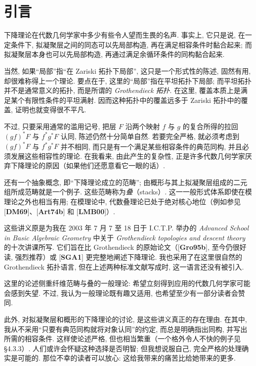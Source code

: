 \chapter*{引言}
下降理论在代数几何学家中多少有些令人望而生畏的名声. 事实上, 它只是说, 在一定条件下, 拟凝聚层之间的同态可以先局部构造, 再在满足相容条件时黏合起来; 而拟凝聚层本身也可以先局部构造, 再通过满足余循环条件的同构黏合起来.

当然, 如果“局部”指“在 Zariski 拓扑下局部”, 这只是一个形式性的陈述, 固然有用, 却很难称得上一个理论. 要点在于, 这里的“局部”指在平坦拓扑下局部; 而平坦拓扑并不是通常意义的拓扑, 而是所谓的 \emph{Grothendieck 拓扑}. 在这里, 覆盖本质上是满足某个有限性条件的平坦满射. 因而这种拓扑中的覆盖远多于 Zariski 拓扑中的覆盖, 证明也就变得很不平凡.

不过, 只要采用通常的滥用记号, 把层 $F$ 沿两个映射 $f$ 与 $g$ 的复合所得的拉回 $(gf)^*F$ 与 $f^*g^*F$ 认同, 陈述仍然十分简单自然. 若要完全严格, 就必须考虑到 $(gf)^*F$ 与 $f^*g^*F$ 并不相同, 而只是有一个满足某些相容条件的典范同构, 并且必须发展这些相容性的理论. 在我看来, 由此产生的复杂性, 正是许多代数几何学家厌弃下降理论的原因（如果他们还愿意看它一眼的话）.

还有一个抽象概念, 即“下降理论成立的范畴”; 由概形与其上拟凝聚层组成的二元组所成范畴就是一个例子. 这些范畴称为\emph{叠}（stacks）. 这一一般形式体系即使在模理论之外也相当有用; 在模理论中, 代数叠理论已处于绝对核心地位（例如参见 [\textbf{DM69}]、[\textbf{Art74b}] 和 [\textbf{LMB00}]）.

这些讲义原是为我在 2003 年 7 月 7 至 18 日于 I.C.T.P. 举办的 \textit{Advanced School in Basic Algebraic Geometry} 中关于 \textit{Grothendieck topologies and descent theory} 的十次讲课所写. 它们旨在比 Grothendieck 的原始论文（[\textbf{Gro95b}], 至今仍很好读, 强烈推荐）或 [\textbf{SGA1}] 更完整地阐述下降理论. 我也采用了在这里很自然的 Grothendieck 拓扑语言, 但在上述两种标准文献写成时, 这一语言还没有被引入.

这里的论述侧重纤维范畴与叠的一般理论: 希望立刻得到应用的代数几何学家可能会感到失望. 不过, 我认为一般理论既有趣又适用, 也希望至少有一部分读者会赞同.

此外, 对拟凝聚层和概形的下降理论的讨论, 是这些讲义真正的存在理由. 在其中, 我从不采用“只要有典范同构就将对象认同”的约定, 而总是明确指出同构, 并写出所需的相容条件. 这样使论述严格, 但也相当繁重（一个格外令人不快的例子见 §4.3.3）. 人们或许会怀疑这种选择是否明智; 但我想说服自己, 完全严格的处理确实是可能的. 那位不幸的读者可以放心: 这给我带来的痛苦比给她带来的更多.

